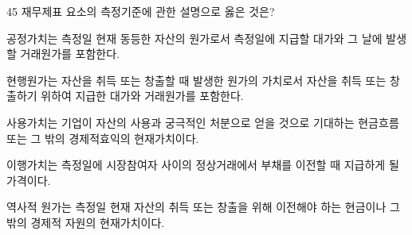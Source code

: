 \begin{question}{45}
재무제표 요소의 측정기준에 관한 설명으로 옳은 것은?
\begin{choices}
  \item 공정가치는 측정일 현재 동등한 자산의 원가로서 측정일에 지급할 대가와 그 날에 발생할 거래원가를 포함한다.
  \item 현행원가는 자산을 취득 또는 창출할 때 발생한 원가의 가치로서 자산을 취득 또는 창출하기 위하여 지급한 대가와 거래원가를 포함한다.
  \item 사용가치는 기업이 자산의 사용과 궁극적인 처분으로 얻을 것으로 기대하는 현금흐름 또는 그 밖의 경제적효익의 현재가치이다.
  \item 이행가치는 측정일에 시장참여자 사이의 정상거래에서 부채를 이전할 때 지급하게 될 가격이다.
  \item 역사적 원가는 측정일 현재 자산의 취득 또는 창출을 위해 이전해야 하는 현금이나 그 밖의 경제적 자원의 현재가치이다.
\end{choices}
\end{question}
